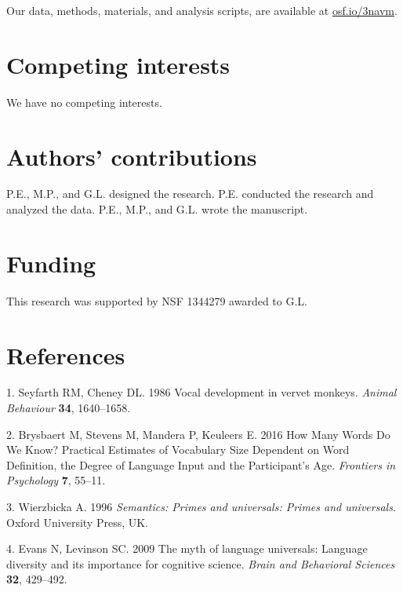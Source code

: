 \documentclass[english,floatsintext,man]{apa6}
\theoremstyle{definition}
\theoremstyle{definition}
\theoremstyle{definition}
\theoremstyle{remark}
\begin{document}
Our data, methods, materials, and analysis scripts, are available at
\href{https://osf.io/3navm}{osf.io/3navm}.

\hypertarget{competing-interests}{%
\section{Competing interests}\label{competing-interests}}

We have no competing interests.

\hypertarget{authors-contributions}{%
\section{Authors' contributions}\label{authors-contributions}}

P.E., M.P., and G.L. designed the research. P.E. conducted the research
and analyzed the data. P.E., M.P., and G.L. wrote the manuscript.

\hypertarget{funding}{%
\section{Funding}\label{funding}}

This research was supported by NSF 1344279 awarded to G.L.

\hypertarget{references}{%
\section{References}\label{references}}

\setlength{\parindent}{-0.5in}
\setlength{\leftskip}{0.5in}

\hypertarget{refs}{}
\leavevmode\hypertarget{ref-Seyfarth:1986tw}{}%
1. Seyfarth RM, Cheney DL. 1986 Vocal development in vervet monkeys.
\emph{Animal Behaviour} \textbf{34}, 1640--1658.

\leavevmode\hypertarget{ref-Brysbaert:2016fg}{}%
2. Brysbaert M, Stevens M, Mandera P, Keuleers E. 2016 How Many Words Do
We Know? Practical Estimates of Vocabulary Size Dependent on Word
Definition, the Degree of Language Input and the Participant's Age.
\emph{Frontiers in Psychology} \textbf{7}, 55--11.

\leavevmode\hypertarget{ref-Wierzbicka:1996sm}{}%
3. Wierzbicka A. 1996 \emph{Semantics: Primes and universals: Primes and
universals}. Oxford University Press, UK.

\leavevmode\hypertarget{ref-Evans:2009dk}{}%
4. Evans N, Levinson SC. 2009 The myth of language universals: Language
diversity and its importance for cognitive science. \emph{Brain and
Behavioral Sciences} \textbf{32}, 429--492.
\end{document}
